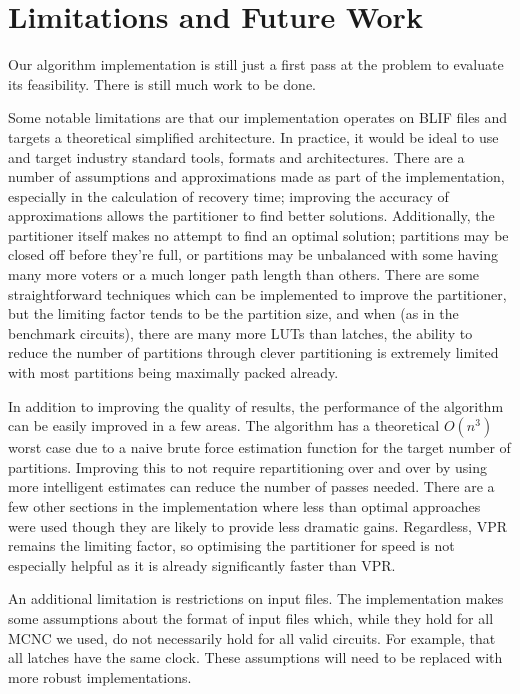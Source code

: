 \documentclass[12pt,final,oneside]{dwThesis} %
\begin{document}
   \chapter{Limitations and Future Work}
   Our algorithm implementation is still
   just a first pass at the problem to evaluate its feasibility. There is still
   much work to be done.

   Some notable limitations are that our implementation operates on \gls{BLIF}
   files and targets a theoretical simplified architecture. In practice, it
   would be ideal to use and target industry standard tools, formats and
   architectures.  There are a number of assumptions and approximations made as
   part of the implementation, especially in the calculation of recovery time;
   improving the accuracy of approximations allows the partitioner to find
   better solutions. Additionally, the partitioner itself makes no attempt to
   find an optimal solution; partitions may be closed off before they're full,
   or partitions may be unbalanced with some having many more voters or a much
   longer path length than others.
   There are some straightforward techniques which can be implemented to improve the partitioner, but the limiting factor tends to be the partition size, and when (as in
   the benchmark circuits), there are many more \glspl{LUT} than latches, the
   ability to reduce the number of partitions through clever partitioning is
   extremely limited with most partitions being maximally packed already.
   
   In addition to improving the quality of results, the performance of the algorithm can be easily improved in a few areas.
   The algorithm has a theoretical $O(n^3)$ worst case due to a naive brute force estimation function for the target number of partitions.
   Improving this to not require repartitioning over and over by using more intelligent estimates can reduce the number of passes needed.
   There are a few other sections in the implementation where less than optimal approaches were used though they are likely to provide less dramatic gains.
   Regardless, \gls{VPR} remains the limiting factor, so optimising the partitioner for speed is not especially helpful as it is already significantly faster than \gls{VPR}.
   
   An additional limitation is restrictions on input files.
   The implementation makes some assumptions about the format of input files which, while they hold for all \gls{MCNC} we used, do not necessarily hold for all valid circuits.
   For example, that all latches have the same clock.
   These assumptions will need to be replaced with more robust implementations.
\end{document}
